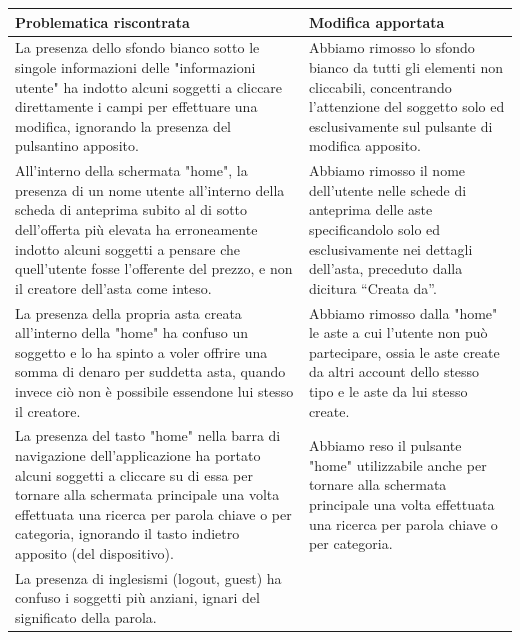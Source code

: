             \begin{center}
            \begin{longtable}{|C{7.35cm}|C{7.35cm}|}
                \hline
                    \textbf{Problematica riscontrata} & \textbf{Modifica apportata}\\
                \hline
                \endhead
                    La presenza dello sfondo bianco sotto le singole informazioni delle "informazioni utente" ha indotto alcuni soggetti a cliccare direttamente i campi per effettuare una modifica, ignorando la presenza del pulsantino apposito. &
                    Abbiamo rimosso lo sfondo bianco da tutti gli elementi non cliccabili, concentrando l’attenzione del soggetto solo ed esclusivamente sul pulsante di modifica apposito. \\
                \hline
                    All'interno della schermata "home", la presenza di un nome utente all’interno della scheda di anteprima subito al di sotto dell’offerta più elevata ha erroneamente indotto alcuni soggetti a pensare che quell’utente fosse l’offerente del prezzo, e non il creatore dell’asta come inteso. &
                    Abbiamo rimosso il nome dell’utente nelle schede di anteprima delle aste specificandolo solo ed esclusivamente nei dettagli dell’asta, preceduto dalla dicitura “Creata da”. \\
                \hline
                    La presenza della propria asta creata all’interno della "home" ha confuso un soggetto e lo ha spinto a voler offrire una somma di denaro per suddetta asta, quando invece ciò non è possibile essendone lui stesso il creatore. &
                    Abbiamo rimosso dalla "home" le aste a cui l’utente non può partecipare, ossia le aste create da altri account dello stesso tipo e le aste da lui stesso create. \\
                \hline
                    La presenza del tasto "home" nella barra di navigazione dell’applicazione ha portato alcuni soggetti a cliccare su di essa per tornare alla schermata principale una volta effettuata una ricerca per parola chiave o per categoria, ignorando il tasto indietro apposito (del dispositivo). &
                    Abbiamo reso il pulsante "home" utilizzabile anche per tornare alla schermata principale una volta effettuata una ricerca per parola chiave o per categoria.\\
                \hline
                    La presenza di inglesismi (logout, guest) ha confuso i soggetti più anziani, ignari del significato della parola. &

\end{longtable}
\end{center}
